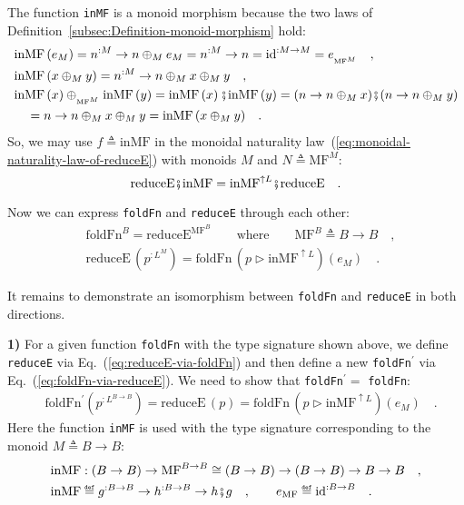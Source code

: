 The function \lstinline!inMF! is a monoid morphism because the two
laws of Definition~\ref{subsec:Definition-monoid-morphism} hold:
\begin{align*}
 & \text{inMF}\,(e_{M})=n^{:M}\rightarrow n\oplus_{M}e_{M}=n^{:M}\rightarrow n=\text{id}^{:M\rightarrow M}=e_{_{\text{MF}^{M}}}\quad,\\
 & \text{inMF}\,(x\oplus_{M}y)=n^{:M}\rightarrow n\oplus_{M}x\oplus_{M}y\quad,\\
 & \text{inMF}\left(x\right)\oplus_{_{\text{MF}^{M}}}\text{inMF}\left(y\right)=\text{inMF}\left(x\right)\bef\text{inMF}\left(y\right)=(n\rightarrow n\oplus_{M}x)\bef(n\rightarrow n\oplus_{M}y)\\
 & \quad=n\rightarrow n\oplus_{M}x\oplus_{M}y=\text{inMF}\,(x\oplus_{M}y)\quad.
\end{align*}
So, we may use $f\triangleq\text{inMF}$ in the monoidal naturality
law~(\ref{eq:monoidal-naturality-law-of-reduceE}) with monoids $M$
and $N\triangleq\text{MF}^{M}$:
\begin{equation}
\text{reduceE}\bef\text{inMF}=\text{inMF}^{\uparrow L}\bef\text{reduceE}\quad.\label{eq:monoidal-naturality-law-of-reduceE-inMF}
\end{equation}

Now we can express \lstinline!foldFn! and \lstinline!reduceE! through
each other:
\begin{align}
 & \text{foldFn}^{B}=\text{reduceE}^{\text{MF}^{B}}\quad\quad\text{where}\quad\quad\text{MF}^{B}\triangleq B\rightarrow B\quad,\label{eq:foldFn-via-reduceE}\\
 & \text{reduceE}\,(p^{:L^{M}})=\text{foldFn}\,(p\triangleright\text{inMF}^{\uparrow L})(e_{M})\quad.\label{eq:reduceE-via-foldFn}
\end{align}

It remains to demonstrate an isomorphism between \lstinline!foldFn!
and \lstinline!reduceE! in both directions.

\textbf{1)} For a given function \lstinline!foldFn! with the type
signature shown above, we define \lstinline!reduceE! via Eq.~(\ref{eq:reduceE-via-foldFn})
and then define a new \lstinline!foldFn!$^{\prime}$ via Eq.~(\ref{eq:foldFn-via-reduceE}).
We need to show that \lstinline!foldFn!$^{\prime}=$ \lstinline!foldFn!:
\begin{align*}
 & \text{foldFn}^{\prime}(p^{:L^{B\rightarrow B}})=\text{reduceE}\,(p)=\text{foldFn}\,(p\triangleright\text{inMF}^{\uparrow L})(e_{M})\quad.
\end{align*}
Here the function \lstinline!inMF! is used with the type signature
corresponding to the monoid $M\triangleq B\rightarrow B$:
\begin{align*}
 & \text{inMF}:\left(B\rightarrow B\right)\rightarrow\text{MF}^{B\rightarrow B}\cong\left(B\rightarrow B\right)\rightarrow\left(B\rightarrow B\right)\rightarrow B\rightarrow B\quad,\\
 & \text{inMF}\triangleq g^{:B\rightarrow B}\rightarrow h^{:B\rightarrow B}\rightarrow h\bef g\quad,\quad\quad e_{\text{MF}}\triangleq\text{id}^{:B\rightarrow B}\quad.
\end{align*}

